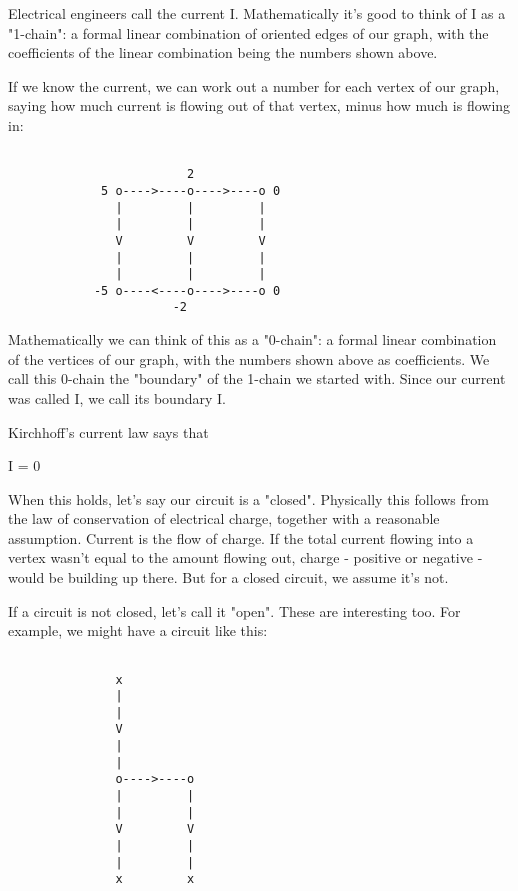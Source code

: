 Electrical engineers call the current I.  Mathematically it's good
to think of I as a "1-chain": a formal linear combination of 
oriented edges of our graph, with the coefficients of the linear combination 
being the numbers shown above.  

If we know the current, we can work out a number for each vertex of
our graph, saying how much current is flowing out of that vertex,
minus how much is flowing in:


\begin{verbatim}

                         2     
             5 o---->----o---->----o 0 
               |         |         | 
               |         |         | 
               V         V         V 
               |         |         | 
               |         |         | 
            -5 o----<----o---->----o 0
                       -2   
\end{verbatim}
    

Mathematically we can think of this as a "0-chain": a formal
linear combination of the vertices of our graph, with the numbers
shown above as coefficients.  We call this 0-chain the
"boundary" of the 1-chain we started with.  Since our
current was called I, we call its boundary \delta I.

Kirchhoff's current law says that 

\delta I = 0

When this holds, let's say our circuit is a "closed".
Physically this follows from the law of conservation of electrical
charge, together with a reasonable assumption.  Current is the flow of
charge.  If the total current flowing into a vertex wasn't equal to
the amount flowing out, charge - positive or negative - would be
building up there.  But for a closed circuit, we assume it's not.

If a circuit is not closed, let's call it "open".  These are
interesting too.  For example, we might have a circuit like this:


\begin{verbatim}

               x
               |    
               |    
               V    
               |    
               |    
               o---->----o
               |         |
               |         |
               V         V
               |         |
               |         |
               x         x         

\end{verbatim}
    
